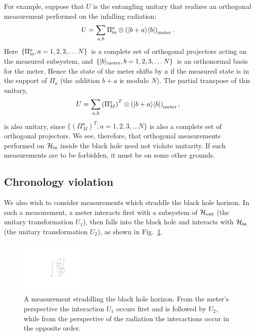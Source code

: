 \documentclass[11pt]{article}
\begin{document}
For example, suppose that $U$ is the entangling unitary that realizes an orthogonal measurement performed on the infalling radiation:
\begin{equation}
U = \sum_{a,b} \Pi^a_{\rm in} \otimes \left(|b+a\rangle\langle b|\right)_{\rm meter}.
\end{equation}
Here $\{\Pi_{\rm in}^a, a=1,2,3,\dots N\}$ is a complete set of orthogonal projectors acting on the measured subsystem, and $\{|b\rangle_{\rm meter}, b = 1,2,3,\dots N\}$ is an orthonormal basis for the meter. Hence the state of the meter shifts by $a$ if the measured state is in the support of $\Pi_a$ (the addition $b+a$ is modulo $N$). The partial transpose of this unitary,
\begin{equation}
U = \sum_{a,b} \left(\Pi^a_{M}\right)^T \otimes \left(|b+a\rangle\langle b|\right)_{\rm meter},
\end{equation}
is also unitary, since $\{\left(\Pi_{M}^a\right)^T, a=1,2,3,\dots N\}$ is also a complete set of orthogonal projectors. We see, therefore, that orthogonal measurements performed on $\mathcal{H}_{\rm in}$ inside the black hole need not violate unitarity. If such measurements are to be forbidden, it must be on some other grounds. 

\subsection{Chronology violation}

We also wish to consider measurements which straddle the black hole horizon. In such a measurement, a meter interacts first with a subsystem of $\mathcal{H}_{\rm out}$ (the unitary transformation $U_1$), then falls into the black hole and interacts with $\mathcal{H}_{\rm in}$ (the unitary transformation $U_2$), as shown in Fig.~\ref{fig:straddle-measure}.

\begin{figure}[t]
\begin{center}
\includegraphics[width=0.3\textwidth]{straddle-measure.pdf}
\end{center}
\caption{A measurement straddling the black hole horizon. From the meter's perspective the interaction $U_1$ occurs first and is followed by $U_2$, while from the perspective of the radiation the interactions occur in the opposite order. }
\label{fig:straddle-measure}
\end{figure}
\end{document}
